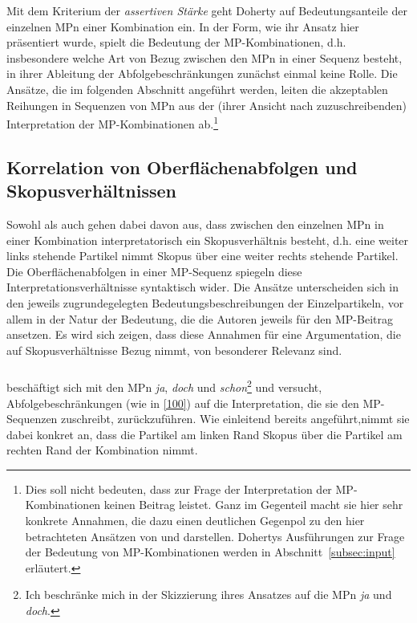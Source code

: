 Mit dem Kriterium der \textit{assertiven Stärke} geht Doherty auf Bedeutungsanteile der einzelnen MPn einer Kombination ein. In der Form, wie ihr Ansatz hier präsentiert wurde, spielt die Bedeutung der MP-Kom\-bi\-na\-ti\-on\-en, d.h. insbesondere welche Art von Bezug zwischen den MPn in einer Sequenz besteht, in ihrer Ableitung der Abfolgebeschränkungen zunächst einmal keine Rolle. Die Ansätze, die im folgenden Abschnitt angeführt werden, leiten die akzeptablen Reihungen in Sequenzen von MPn aus der (ihrer Ansicht nach zuzuschreibenden) Interpretation der MP-Kom\-bi\-na\-ti\-on\-en ab.\footnote{Dies soll nicht bedeuten, dass \citet{Doherty1985, Doherty1987} zur Frage der Interpretation der MP-Kom\-bi\-na\-ti\-on\-en keinen Beitrag leistet. Ganz im Gegenteil macht sie hier sehr konkrete Annahmen, die dazu einen deutlichen Gegenpol zu den hier betrachteten Ansätzen von \citet{Ormelius-Sandblom1997} und \citet{Rinas2006, Rinas2007} darstellen. Dohertys Ausführungen zur Frage der Bedeutung von MP-Kom\-bi\-na\-ti\-on\-en werden in Abschnitt~\ref{subsec:input} erläutert.}

\subsection{Korrelation von Oberflächenabfolgen und Skopusverhältnissen}
\label{sec:skopus}
Sowohl \citet{Ormelius-Sandblom1997} als auch \citet{Rinas2006, Rinas2007} gehen dabei davon aus, dass zwischen den einzelnen MPn in einer Kombination interpretatorisch ein Skopusverhältnis  besteht, d.h. eine weiter links stehende Partikel nimmt Skopus über eine weiter rechts stehende Partikel. Die Oberflächenabfolgen in einer MP-Sequenz spiegeln diese Interpretationsverhältnisse syntaktisch wider. Die Ansätze unterscheiden sich in den jeweils zugrundegelegten Bedeutungsbeschreibungen der Einzelpartikeln, vor allem in der Natur der Bedeutung, die die Autoren jeweils für den MP-Beitrag ansetzen. Es wird sich zeigen, dass diese Annahmen für eine Argumentation, die auf Skopusverhältnisse Bezug nimmt, von besonderer Relevanz sind. 

\subsubsection{\citet{Ormelius-Sandblom1997}}
\label{sec:os}
\citet{Ormelius-Sandblom1997} beschäftigt sich mit den MPn \textit{ja}, \textit{doch} und \textit{schon}\footnote{Ich beschränke mich in der Skizzierung ihres Ansatzes auf die MPn \textit{ja} und \textit{doch}.} und versucht, Abfolgebeschränkungen (wie in \ref{100}) auf die Interpretation, die sie den MP-Sequenzen zuschreibt, zurückzuführen. Wie einleitend bereits angeführt,\linebreak nimmt sie dabei konkret an, dass die Partikel am linken Rand Skopus  über die Partikel am rechten Rand der Kombination nimmt.	


